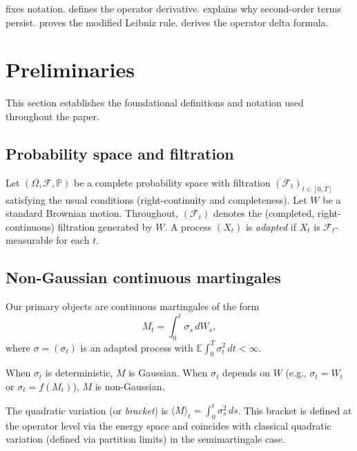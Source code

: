 \documentclass[11pt]{article}
\theoremstyle{plain}
\theoremstyle{definition}
\theoremstyle{remark}
\newcommand{\E}{\mathbb{E}}
\newcommand{\F}{\mathcal{F}}
\begin{document}
 fixes notation.  defines the operator 
derivative.  explains why second-order terms persist. 
 proves the modified Leibniz rule.  derives 
the operator delta formula.

\section{Preliminaries}\label{sec:prelim}

This section establishes the foundational definitions and notation used 
throughout the paper.

\subsection{Probability space and filtration}

Let $(\Omega, \F, \mathbb{P})$ be a complete probability space with filtration 
$(\F_t)_{t \in [0,T]}$ satisfying the usual conditions (right-continuity and 
completeness). Let $W$ be a standard Brownian motion. Throughout, $(\F_t)$ 
denotes the (completed, right-continuous) filtration generated by $W$. A process 
$(X_t)$ is \emph{adapted} if $X_t$ is $\F_t$-measurable for each $t$.

\subsection{Non-Gaussian continuous martingales}

Our primary objects are continuous martingales of the form
\begin{equation}\label{eq:M-def}
M_t = \int_0^t \sigma_s\,dW_s,
\end{equation}
where $\sigma = (\sigma_t)$ is an adapted process with $\E\int_0^T \sigma_t^2\,dt < \infty$.

When $\sigma_t$ is deterministic, $M$ is Gaussian. When $\sigma_t$ depends on 
$W$ (e.g., $\sigma_t = W_t$ or $\sigma_t = f(M_t)$), $M$ is non-Gaussian.

The quadratic variation (or \emph{bracket}) is $\langle M \rangle_t = \int_0^t \sigma_s^2\,ds$. 
This bracket is defined at the operator level via the energy space and coincides 
with classical quadratic variation (defined via partition limits) in the 
semimartingale case.
\end{document}
